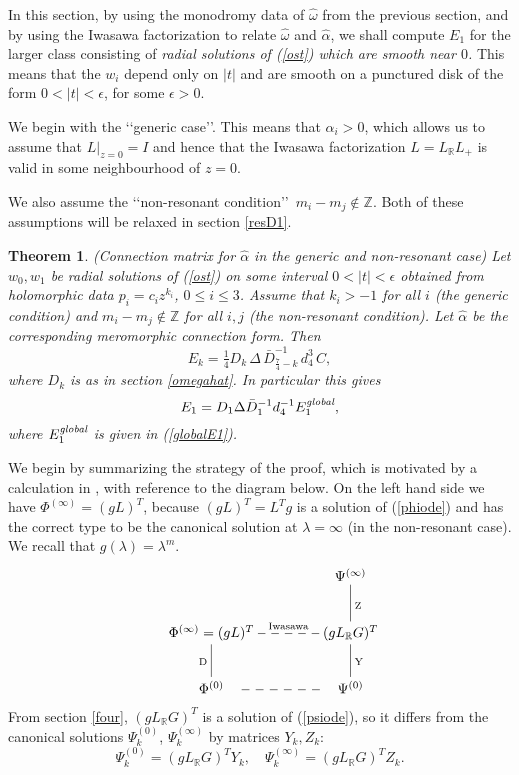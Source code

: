 \documentclass[a4paper,12pt,leqno]{amsart}
\numberwithin{equation}{section}
\theoremstyle{plain}
\newtheorem{theorem}{Theorem}[section]
\theoremstyle{definition}
\newcommand{\R}{\mathbb R}
\newcommand{\Z}{\mathbb Z}
\newcommand{\al}{\alpha}
\newcommand{\la}{\lambda}
\newcommand{\eps}{\epsilon}
\newcommand{\De}{\Delta}
\newcommand{\om}{\omega}
\renewcommand{\ll}{\lq\lq}
\newcommand{\rr}{\rq\rq\ }
\newcommand{\rrr}{\rq\rq}
\newcommand{\Psiz}{  \Psi^{(0)}  }
\newcommand{\Psii}{  \Psi^{(\infty)}  }
\newcommand{\Phiz}{\Phi^{(0)}}
\newcommand{\Phii}{\Phi^{(\infty)}}
\newcommand{\nn}{m}
\begin{document}
In this section, by using the monodromy data of $\hat\om$ from the previous section, and by using the Iwasawa factorization to relate $\hat\om$ and $\hat\al$, we shall compute $E_1$ for the larger class consisting of {\em radial solutions of (\ref{ost}) which are smooth near $0$.}  This means that the $w_i$ depend only on $\vert t\vert$ and are smooth on a punctured disk of the form $0<\vert t\vert < \eps$, for some $\eps>0$.  

We begin with the \ll generic case\rrr. 
This means that $\al_i> 0$, 
which allows us to assume that 
$L\vert_{z=0}=I$ and hence that
the Iwasawa factorization $L=L_\R L_+$ is valid in some neighbourhood of $z=0$.  

We also assume the \ll non-resonant condition\rr $\nn_i-\nn_j\notin\Z$.  Both of these assumptions will be relaxed in section \ref{resD1}.

\begin{theorem}\label{e}  {\em (Connection matrix for $\hat\al$ in the generic and non-resonant case)}
Let $w_0,w_1$ be radial solutions of (\ref{ost}) on some interval $0<\vert t\vert < \eps$ obtained from holomorphic data $p_i=c_i z^{k_i}$, $0\le i\le 3$. Assume that $k_i>-1$ for all $i$ (the generic condition) and
$\nn_i-\nn_j\notin\Z$ for all $i,j$ (the non-resonant condition).  
Let $\hat\al$ be the corresponding meromorphic connection form. Then
\[
E_k=\tfrac14 D_k\, \De\, \bar D_{\frac74-k}^{-1}\, d_4^3\,  C, 
\]
where $D_k$ is as in section \ref{omegahat}.  In particular this gives
\[
E_1=D_1 \De \bar D_1^{-1} d_4^{-1} E_1^{\text{\em global}},
\]
where $E_1^{\text{\em global}}$ is given in (\ref{globalE1}).
\end{theorem}

We begin by summarizing the strategy of the proof, which is motivated by a calculation in \cite{BoIt95}, with reference to the diagram below. On the left hand side we have 
$\Phii = (gL)^T$, because $(gL)^T=L^Tg$ is a solution of  (\ref{phiode}) and
has the correct type to be the canonical solution at $\la=\infty$ (in the non-resonant case). We recall that $g(\la)=\la^\nn$.
\[
\xymatrix{
 \quad \quad \quad \quad \quad \quad \quad \quad\quad\quad
  &   \Psii\ar@{-}[d]^{\text{Z}}
\\
 \Phii = (gL)^T\ar@{--}[r]^{\text{\ \ \ \  Iwasawa}}    &    (g L_\R G)^T
\\
 \quad \Phiz\ar@{-}[u]^{\text{D}}\ar@{--}[r]   \quad   &  \quad \Psiz\ar@{-}[u]_{\text{Y}}\quad
}
\]
From section \ref{four}, $(g L_\R G)^T$ is a solution of (\ref{psiode}), so it differs from the canonical solutions $\Psiz_k$, $\Psii_k$ by matrices $Y_k,Z_k$:
\[
\Psiz_k=(g L_\R G)^T Y_k,\quad \Psii_k=(g L_\R G)^T Z_k.
\]
\end{document}
